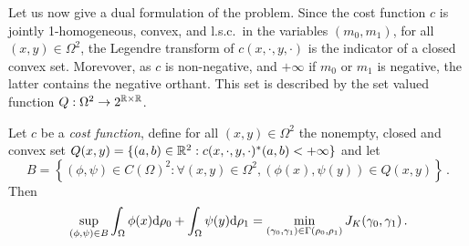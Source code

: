 Let us now give a dual formulation of the problem. 
Since the cost function $c$ is jointly 1-homogeneous, convex, and l.s.c.\ in the variables $(m_0,m_1)$, for all $(x,y)\in \Omega^2$, the Legendre transform of $c(x,\cdot,y,\cdot)$ is the indicator of a closed convex set. Morevover, as $c$ is non-negative, and $+\infty$ if $m_0$ or $m_1$ is negative, the latter contains the negative orthant. This set is described by the set valued function $Q : \Omega^2 \to 2^{\mathbb{R} \times \mathbb{R}}$. 


\begin{theorem}[Duality]
\label{th: duality}
Let $c$ be a \emph{cost function}, define for all $(x,y)\in \Omega^2$ the nonempty, closed and convex set $Q(x,y)= \{(a,b)\in \mathbb{R}^2 : c(x,\cdot,y,\cdot)^*(a,b)<+\infty \}$ and let
\[ 
B =  \left\{ (\phi, \psi) \in C(\Omega)^2 :  \forall (x,y) \in \Omega^2, (\phi(x),\psi(y)) \in Q(x,y) \right\}\,.
\]
Then
\[
 \sup_{(\phi, \psi) \in B} \int_{\Omega} \phi(x) \mathrm{d} \rho_0 + \int_{\Omega} \psi(y) \mathrm{d} \rho_1 
 = \min_{(\gamma_0, \gamma_1)\in \Gamma(\rho_0, \rho_1)} J_K(\gamma_0, \gamma_1)  \, .
\]
\end{theorem}

